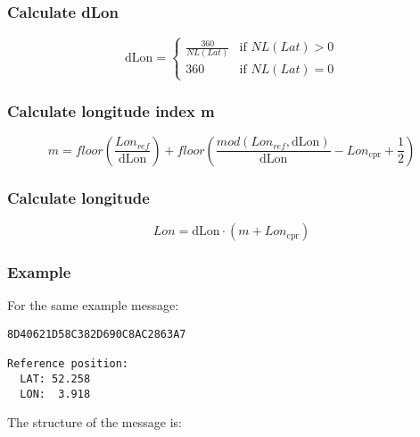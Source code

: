 \subsubsection{Calculate dLon}\label{calculate-dlon}

\begin{equation}
  \mathrm{dLon} =
  \begin{cases}
   \frac{360}{NL(Lat)}    & \text{if } NL(Lat) > 0  \\
   360                    & \text{if } NL(Lat) = 0
  \end{cases}
\end{equation}

\subsubsection{Calculate longitude index
m}\label{calculate-longitude-index-m}

\begin{equation}
  m = floor \left( \frac{Lon_{ref}}{\mathrm{dLon}} \right) + floor \left( \frac{mod(Lon_{ref}, \mathrm{dLon})}{\mathrm{dLon}}  - Lon_\mathrm{cpr}  + \frac{1}{2}  \right)
\end{equation}

\subsubsection{Calculate longitude}\label{calculate-longitude-1}

\begin{equation}
  Lon = \mathrm{dLon} \cdot (m + Lon_\mathrm{cpr})
\end{equation}

\subsubsection{Example}\label{example}

For the same example message:

\begin{verbatim}
8D40621D58C382D690C8AC2863A7

Reference position:
  LAT: 52.258
  LON:  3.918
\end{verbatim}

The structure of the message is:

